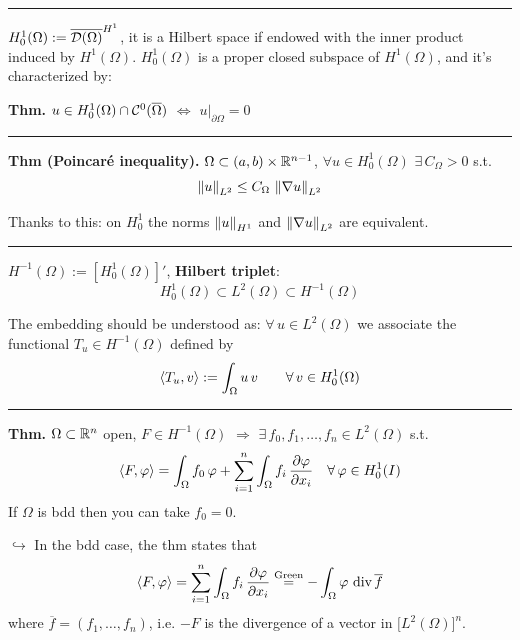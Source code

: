 \rule{0.31\textwidth}{0.2pt}
\smallskip

$H^1_0(\Omega):=\overline{\mathcal{D}(\Omega)}^{H^1}$, it is a Hilbert space if endowed with the inner product induced by $H^1(\Omega)$. $H^1_0(\Omega)$ is a proper closed subspace of $H^1(\Omega)$, and it's characterized by:

\smallskip

\textbf{Thm.} $u\in H^1_0(\Omega)\cap \mathcal{C}^0(\overline{\Omega})$ $\Longleftrightarrow$ $u\big|_{\partial \Omega}=0$

\rule{0.31\textwidth}{0.2pt}
\smallskip

\textbf{Thm (Poincaré inequality).} $\Omega\subset (a,b)\times \mathbb{R}^{n-1}$, $\forall u\in H^1_0(\Omega)$ $\exists\,C_\Omega>0$ s.t.
\begin{equation*}
\left\lVert u \right\rVert_{L^2}\leq C_\Omega\, \left\lVert \nabla u \right\rVert_{L^2}
\end{equation*}

\smallskip

Thanks to this: on $H^1_0$ the norms $\left\lVert u \right\rVert_{H^1}$ and $\left\lVert \nabla u \right\rVert_{L^2}$ are equivalent.

\rule{0.31\textwidth}{0.2pt}
\smallskip

$H^{-1}(\Omega):=\left[ H^1_0(\Omega) \right]'$,  \textbf{Hilbert triplet}:
\begin{equation*}
H_0^1(\Omega)\subset L^2(\Omega) \subset H^{-1}(\Omega)
\end{equation*}

The embedding should be understood as: $\forall\, u\in L^2(\Omega)$ we associate the functional $T_u\in H^{-1}(\Omega)$ defined by
\begin{equation*}
\left\langle T_u,v \right\rangle:=\int_\Omega u\,v\qquad \forall\, v\in H^1_0(\Omega)
\end{equation*}

\rule{0.31\textwidth}{0.2pt}
\smallskip

\textbf{Thm.} $\Omega\subset \mathbb{R}^n$ open, $F\in H^{-1}(\Omega)$ $\Longrightarrow$ $\exists\,f_0,f_1,\dots,f_n\in L^2(\Omega)$ s.t.
\begin{equation*}
\left\langle F,\varphi \right\rangle=\int_\Omega f_0\,\varphi+\sum_{i=1}^n \int_\Omega f_i\,\frac{\partial\varphi}{\partial x_i}\quad \forall\,\varphi\in H^1_0(I)
\end{equation*}
If $\Omega$ is bdd then you can take $f_0=0$.

\medskip

$\hookrightarrow$ In the bdd case, the thm  states that 
\begin{equation*}
\sca{F,\varphi}=\sum_{i=1}^n \int_\Omega f_i\,\frac{\partial\varphi}{\partial x_i}\overset{\text{Green}}{=}-\int_\Omega \varphi\ \text{div}\,\overline{f}
\end{equation*}
where $\overline{f}=(f_1,\dots,f_n)$, i.e. $-F$ is the divergence of a vector in $\big[L^2(\Omega)\big]^n$.

